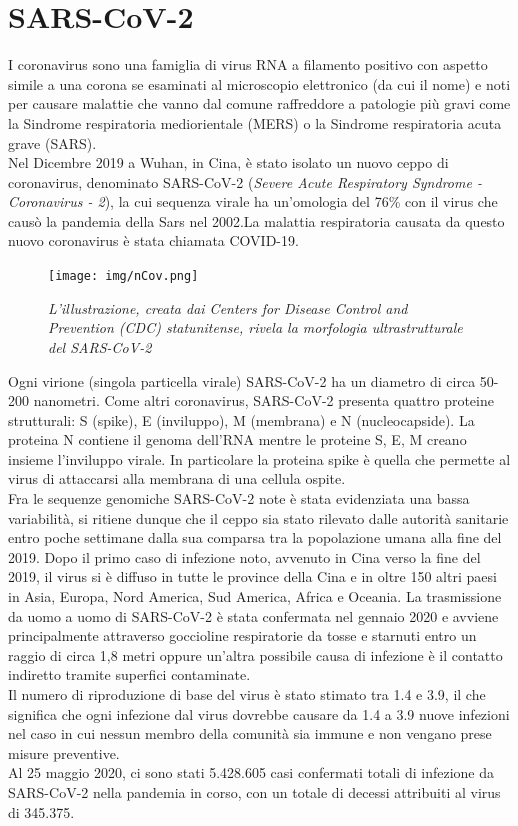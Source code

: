 \documentclass[a4paper,10pt]{article}
\begin{document}
\tableofcontents

\newpage

\section{SARS-CoV-2}
I coronavirus sono una famiglia di virus RNA a filamento positivo con aspetto simile a una corona se esaminati al microscopio elettronico (da cui il nome) e noti per causare malattie che vanno dal comune raffreddore a patologie più gravi come la Sindrome respiratoria mediorientale (MERS) o la Sindrome respiratoria acuta grave (SARS). \\
Nel Dicembre 2019 a Wuhan, in Cina, è stato isolato un nuovo ceppo di coronavirus, denominato SARS-CoV-2 (\textit{Severe Acute Respiratory Syndrome - Coronavirus - 2}), la cui sequenza virale ha un'omologia del 76\% con il virus che causò la pandemia della Sars nel 2002.La malattia respiratoria causata da questo nuovo coronavirus è stata chiamata COVID-19.

\begin{figure}[H]
\centering
\texttt{[image: img/nCov.png]}
\caption{\textit{L’illustrazione, creata dai Centers for Disease Control and Prevention (CDC) statunitense, rivela la morfologia ultrastrutturale del SARS-CoV-2}}
\label{fig:1}
\end{figure}

Ogni virione (singola particella virale) SARS-CoV-2 ha un diametro di circa 50-200 nanometri. Come altri coronavirus, SARS-CoV-2 presenta quattro proteine strutturali: S (spike), E (inviluppo), M (membrana) e N (nucleocapside). La proteina N contiene il genoma dell'RNA mentre le proteine S, E, M creano insieme l'inviluppo virale. %
In particolare la proteina spike è quella che permette al virus di attaccarsi alla membrana di una cellula ospite.\\

Fra le sequenze genomiche SARS-CoV-2 note è stata evidenziata una bassa variabilità, si ritiene dunque che il ceppo sia stato rilevato dalle autorità sanitarie entro poche settimane dalla sua comparsa tra la popolazione umana alla fine del 2019.
Dopo il primo caso di infezione noto, avvenuto in Cina verso la fine del 2019, il virus si è diffuso in tutte le province della Cina e in oltre 150 altri paesi in Asia, Europa, Nord America, Sud America, Africa e Oceania.
La trasmissione da uomo a uomo di SARS-CoV-2 è stata confermata nel gennaio 2020 e avviene principalmente attraverso goccioline respiratorie da tosse e starnuti entro un raggio di circa 1,8 metri oppure un'altra possibile causa di infezione è il contatto indiretto tramite superfici contaminate.\\
Il numero di riproduzione di base del virus è stato stimato tra 1.4 e 3.9, il che significa che ogni infezione dal virus dovrebbe causare da 1.4 a 3.9 nuove infezioni nel caso in cui nessun membro della comunità sia immune e non vengano prese misure preventive.\\
Al 25 maggio 2020, ci sono stati 5.428.605 casi confermati totali di infezione da SARS-CoV-2 nella pandemia in corso, con un totale di decessi attribuiti al virus di 345.375. 
\end{document}
